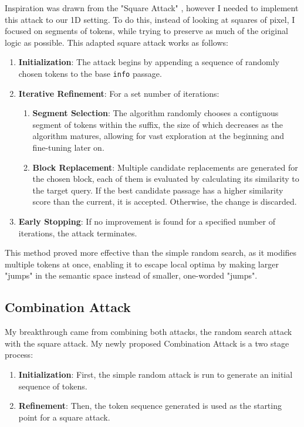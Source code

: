 \documentclass[a4paper, sigconf]{acmart}
\begin{document}
Inspiration was drawn from the "Square Attack" \cite{andriushchenko2020}, however I needed to implement this attack to our 1D setting. To do this, instead of looking at squares of pixel, I focused on segments of tokens, while trying to preserve as much of the original logic as possible. This adapted square attack works as follows:

\begin{enumerate}
  \item \textbf{Initialization}: The attack begins by appending a sequence of randomly chosen tokens to the base \texttt{info} passage. 
  \item \textbf{Iterative Refinement}: For a set number of iterations: 
  \begin{enumerate}
    \item \textbf{Segment Selection}: The algorithm randomly chooses a contiguous segment of tokens within the suffix, the size of which decreases as the algorithm matures, allowing for vast exploration at the beginning and fine-tuning later on. 
    \item \textbf{Block Replacement}: Multiple candidate replacements are generated for the chosen block, each of them is evaluated by calculating its similarity to the target query. If the best candidate passage has a higher similarity score than the current, it is accepted. Otherwise, the change is discarded. 
  \end{enumerate}
  \item \textbf{Early Stopping}: If no improvement is found for a specified number of iterations, the attack terminates.
\end{enumerate}
 
This method proved more effective than the simple random search, as it modifies multiple tokens at once, enabling it to escape local optima by making larger "jumps" in the semantic space instead of smaller, one-worded "jumps". 

 
\subsection{Combination Attack}

My breakthrough came from combining both attacks, the random search attack with the square attack. My newly proposed Combination Attack is a two stage process:

\begin{enumerate}
  \item \textbf{Initialization}: First, the simple random attack is run to generate an initial sequence of tokens. 
  \item \textbf{Refinement}: Then, the token sequence generated is used as the starting point for a square attack.
\end{enumerate}
\end{document}
